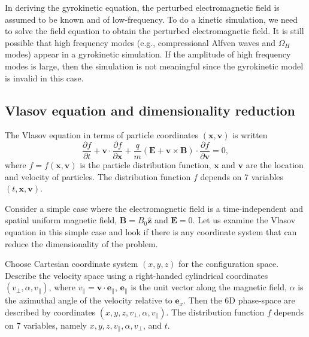 \documentclass{llncs}
\begin{document}
In deriving the gyrokinetic equation, the perturbed electromagnetic field is
assumed to be known and of low-frequency. To do a kinetic simulation, we need
to solve the field equation to obtain the perturbed electromagnetic field. It
is still possible that high frequency modes (e.g., compressional Alfven waves
and $\Omega_H$ modes) appear in a gyrokinetic simulation. If the amplitude of
high frequency modes is large, then the simulation is not meaningful since the
gyrokinetic model is invalid in this case.

\subsection{Vlasov equation and dimensionality reduction}\label{19-4-23-p1}

The Vlasov equation in terms of particle coordinates $(\mathbf{x},
\mathbf{v})$ is written
\begin{equation}
  \label{22-11-12-1} \frac{\partial f}{\partial t} +\mathbf{v} \cdot
  \frac{\partial f}{\partial \mathbf{x}} + \frac{q}{m} (\mathbf{E}+\mathbf{v}
  \times \mathbf{B}) \cdot \frac{\partial f}{\partial \mathbf{v}} = 0,
\end{equation}
where $f = f (\mathbf{x}, \mathbf{v})$ is the particle distribution function,
$\mathbf{x}$ and $\mathbf{v}$ are the location and velocity of particles. The
distribution function $f$ depends on 7 variables $(t, \mathbf{x},
\mathbf{v})$.

Consider a simple case where the electromagnetic field is a time-independent
and spatial uniform magnetic field, $\mathbf{B}= B_0 \hat{\mathbf{z}}$ and
$\mathbf{E}= 0$. Let us examine the Vlasov equation in this simple case and
look if there is any coordinate system that can reduce the dimensionality of
the problem.

Choose Cartesian coordinate system $(x, y, z)$ for the configuration space.
Describe the velocity space using a right-handed cylindrical coordinates
$(v_{\perp}, \alpha, v_{\parallel})$, where $v_{\parallel} =\mathbf{v} \cdot
\mathbf{e}_{\parallel}$, $\mathbf{e}_{\parallel}$ is the unit vector along the
magnetic field, $\alpha$ is the azimuthal angle of the velocity relative to
$\mathbf{e}_x$. Then the 6D phase-space are described by coordinates $(x, y,
z, v_{\perp}, \alpha, v_{\parallel})$. The distribution function $f$ depends
on 7 variables, namely $x, y, z, v_{\parallel}, \alpha, v_{\perp}$, and $t$.
\end{document}
